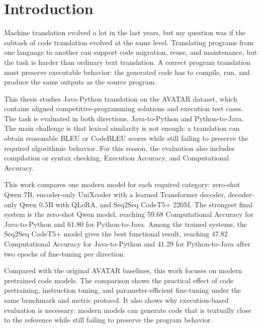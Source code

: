 \chapter{Introduction}

\quad Machine translation evolved a lot in the last years, 
but my question was if the subtask of code translation
evolved at the same level. Translating programs from one
language to another can support code migration, reuse, and maintenance, but the
task is harder than ordinary text translation. A correct program translation
must preserve executable behavior: the generated code has to compile, run, and
produce the same outputs as the source program.

This thesis studies Java-Python translation on the AVATAR dataset, which
contains aligned competitive-programming solutions and execution test cases. The
task is evaluated in both directions, Java-to-Python and Python-to-Java. The
main challenge is that lexical similarity is not enough: a translation can
obtain reasonable BLEU or CodeBLEU scores while still failing to preserve the
required algorithmic behavior. For this reason, the evaluation also includes
compilation or syntax checking, Execution Accuracy, and Computational Accuracy.

This work compares one modern model for each required category: zero-shot Qwen
7B, encoder-only UniXcoder with a learned Transformer decoder, decoder-only Qwen
0.5B with QLoRA, and Seq2Seq CodeT5+ 220M. The strongest final system is the
zero-shot Qwen model, reaching 59.68
Computational Accuracy for Java-to-Python and 61.80 for Python-to-Java. Among
the trained systems, the Seq2Seq CodeT5+ model gives the best functional
result, reaching 47.82 Computational Accuracy for Java-to-Python and 41.29 for
Python-to-Java after two epochs of fine-tuning per direction.

Compared with the original AVATAR baselines, this work focuses on modern
pretrained code models. The comparison shows the practical effect of code pretraining,
instruction tuning, and parameter-efficient fine-tuning under the same benchmark
and metric protocol. It also shows why execution-based evaluation is necessary:
modern models can generate code that is textually close to the reference while
still failing to preserve the program behavior.
